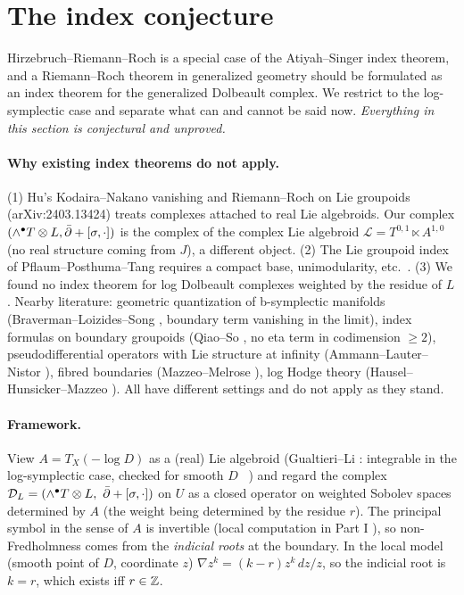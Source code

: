 \section{The index conjecture}\label{sec:index}
Hirzebruch--Riemann--Roch is a special case of the Atiyah--Singer index theorem, and a Riemann--Roch theorem in generalized geometry should be formulated as an index theorem for the generalized Dolbeault complex. We restrict to the log-symplectic case and separate what can and cannot be said now. \emph{Everything in this section is conjectural and unproved.}

\paragraph{Why existing index theorems do not apply.} (1) Hu's Kodaira--Nakano vanishing and Riemann--Roch on Lie groupoids (arXiv:2403.13424) \cite{Hu} treats complexes attached to real Lie algebroids. Our complex $(\wedge^\bullet T\otimes L,\bar\partial+[\sigma,\cdot])$ is the complex of the complex Lie algebroid $\mathcal L=T^{0,1}\ltimes A^{1,0}$ (no real structure coming from $J$), a different object. (2) The Lie groupoid index of Pflaum--Posthuma--Tang \cite{PPT} requires a compact base, unimodularity, etc.\ \tQ. (3) We found no index theorem for log Dolbeault complexes weighted by the residue of $L$. Nearby literature: geometric quantization of b-symplectic manifolds (Braverman--Loizides--Song \cite{BLS}, boundary term vanishing in the limit), index formulas on boundary groupoids (Qiao--So \cite{QS}, no eta term in codimension $\ge2$), pseudodifferential operators with Lie structure at infinity (Ammann--Lauter--Nistor \cite{ALN}), fibred boundaries (Mazzeo--Melrose \cite{MM}), log Hodge theory (Hausel--Hunsicker--Mazzeo \cite{HHM}). All have different settings and do not apply as they stand.

\paragraph{Framework.} View $A=T_X(-\log D)$ as a (real) Lie algebroid (Gualtieri--Li \cite{GL}: integrable in the log-symplectic case, checked for smooth $D$ \tC\ \tQ) and regard the complex $\mathcal D_L=(\wedge^\bullet T\otimes L,\ \bar\partial+[\sigma,\cdot])$ on $U$ as a closed operator on weighted Sobolev spaces determined by $A$ (the weight being determined by the residue $r$). The principal symbol in the sense of $A$ is invertible (local computation in Part I \tV), so non-Fredholmness comes from the \emph{indicial roots} at the boundary. In the local model (smooth point of $D$, coordinate $z$) $\nabla z^k=(k-r)z^k\,dz/z$, so the indicial root is $k=r$, which exists iff $r\in\mathbb Z$.

